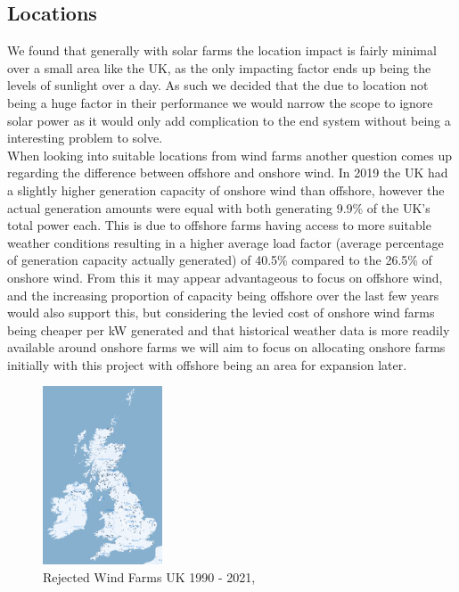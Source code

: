\documentclass[twoside]{article}
\begin{document}
\subsection{Locations}
We found that generally with solar farms the location impact is fairly minimal over a small area like the UK, as the only impacting factor ends up being the levels of sunlight over a day. As such we decided that the due to location not being a huge factor in their performance we would narrow the scope to ignore solar power as it would only add complication to the end system without being a interesting problem to solve.
\\
\noindent When looking into suitable locations from wind farms another question comes up regarding the difference between offshore and onshore wind. In 2019 the UK had a slightly higher generation capacity of onshore wind than offshore, however the actual generation amounts were equal with both generating 9.9\% of the UK's total power each.\cite{energy_trends_mar2020} This is due to offshore farms having access to more suitable weather conditions resulting in a higher average load factor (average percentage of generation capacity actually generated) of 40.5\% compared to the 26.5\% of onshore wind\cite{energy_trends_mar2020}. From this it may appear advantageous to focus on offshore wind, and the increasing proportion of capacity being offshore over the last few years would also support this, but considering the levied cost of onshore wind farms being cheaper per kW generated \cite{irena} and that historical weather data is more readily available around onshore farms we will aim to focus on allocating onshore farms initially with this project with offshore being an area for expansion later.
\begin{figure}[!h]
    \centering
    \includegraphics[height=200px]{RejectedWindApplications.png}
    \caption{Rejected Wind Farms UK 1990 - 2021, \cite{renew_database}}
    \label{fig:rejected_wind_farms}
\end{figure}
\\
\end{document}
